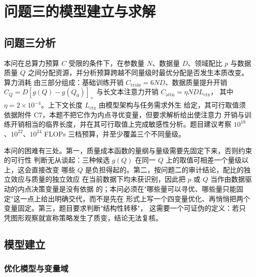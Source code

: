 \documentclass[bwprint]{gmcmthesis}
\numberwithin{equation}{section}
\numberwithin{figure}{section}
\numberwithin{table}{section}
\begin{document}
\clearpage
\section{问题三的模型建立与求解}



\subsection{问题三分析}

本问在总算力预算 $C$ 受限的条件下，在参数量 $N$、数据量 $D$、领域配比 $p$ 与数据
质量 $Q$ 之间分配资源，并分析预算跨越不同量级时最优分配是否发生本质改变。算力消耗
由三部分组成：基础训练开销 $C_{\mathrm{train}}=6ND$、数据质量提升开销
$C_Q=D[g(Q)-g(Q_0)]_+$ 与长文本注意力开销 $C_{\mathrm{attn}}=\eta ND L_{\mathrm{ctx}}$，
其中 $\eta=2\times10^{-4}$。上下文长度 $L_{\mathrm{ctx}}$ 由模型架构与任务需求外生
给定，其可行取值须依据附件 C7，本题不把它作为内点寻优变量，但要求解析给出使注意力
开销与训练开销相当的临界长度，并在其可行取值上完成敏感性分析。题目建议考察
$10^{19}$、$10^{22}$、$10^{24}$ FLOPs 三档预算，并至少覆盖三个不同量级。

本问的困难有三处。第一，质量成本函数的量纲与量级需要先固定下来，否则约束的可行性
判断无从谈起：三种候选 $g(Q)$ 在同一 $Q$ 上的取值可相差一个量级以上，这会直接改变
哪些 $Q$ 是负担得起的。第二，按问题二的审计结论，配比的独立效应与质量的独立效应
在当前数据下均未获识别，因此把 $p$ 或 $Q$ 当作由数据驱动的内点决策变量是没有依据
的；本问必须在"哪些量可以寻优、哪些量只能固定"这一点上给出明确交代，而不是先在
形式上写一个四变量优化、再悄悄把两个变量固定。第三，题目要求判断"结构性转移"，
这需要一个可证伪的定义：若只凭图形观察就宣称策略发生了质变，结论无法复核。

\subsection{模型建立}

\subsubsection{优化模型与变量域}
\end{document}
